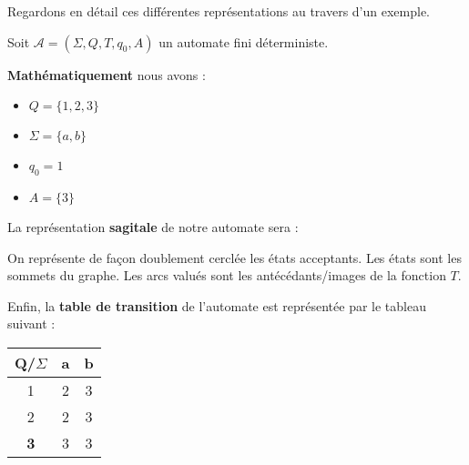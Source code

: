Regardons en détail ces différentes représentations au travers d'un exemple. 

\begin{example}
    Soit $\mathcal{A} = (\Sigma, Q, T, q_0, A)$ un automate fini déterministe. 

    \textbf{Mathématiquement} nous avons :
    \begin{itemize}
        \item $Q = \{1,2,3\}$ 
        \item $\Sigma = \{a,b\}$ 
        \item $q_0 = 1$ 
        \item $A = \{3\}$ 
    \end{itemize}
    
    La représentation \textbf{sagitale}  de notre automate sera :
        
        \begin{center}
            \begin{figure}[h]
                \centering
            \end{figure}
        \end{center}

    On représente de façon doublement cerclée les états acceptants. Les états sont les sommets du graphe. 
    Les arcs valués sont les antécédants/images de la fonction $T$. 

    Enfin, la \textbf{table de transition} de l'automate est représentée par le tableau suivant :
    \begin{multicols}{2}
        \begin{center}
            \begin{tabular}{c|c|c}
                Q/$\Sigma$ & a & b \\ \hline 
                1 & 2 & 3 \\ \hline 
                2 & 2 & 3 \\ \hline 
                \textbf{3} & 3 & 3 
            \end{tabular}
        \end{center}


\end{multicols}
\end{example}
